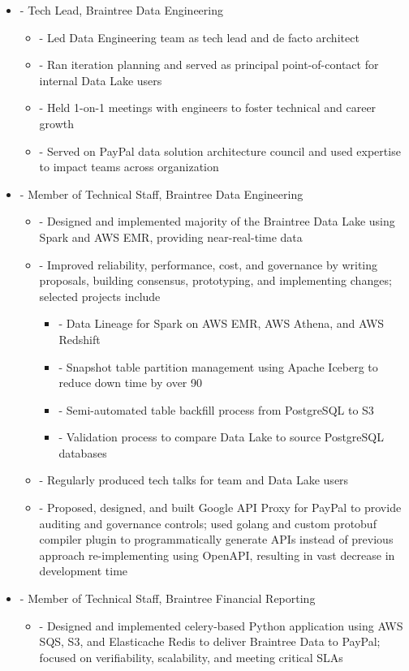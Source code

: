 \documentclass[a4paper,11pt]{article}
\newenvironment{pitemize}{
\begin{itemize}
\setlength{\itemsep}{.01in}
\setlength{\parskip}{.01in}
}
{\end{itemize}}
\begin{document}
\begin{pitemize}
    \item[-]Tech Lead, Braintree Data Engineering
    \begin{pitemize}
        \item[-]Led Data Engineering team as tech lead and de facto architect
        \item[-]Ran iteration planning and served as principal point-of-contact for internal Data Lake users
        \item[-]Held 1-on-1 meetings with engineers to foster technical and career growth
        \item[-]Served on PayPal data solution architecture council and used expertise to impact teams across organization
    \end{pitemize}
    \item[-]Member of Technical Staff, Braintree Data Engineering
    \begin{pitemize}
        \item[-]Designed and implemented majority of the Braintree Data Lake using Spark and AWS EMR, providing near-real-time data
        \item[-]Improved reliability, performance, cost, and governance by writing proposals, building consensus, prototyping, and implementing changes; selected projects include
        \begin{pitemize}
            \item[-]Data Lineage for Spark on AWS EMR, AWS Athena, and AWS Redshift
            \item[-]Snapshot table partition management using Apache Iceberg to reduce down time by over 90%
            \item[-]Semi-automated table backfill process from PostgreSQL to S3
            \item[-]Validation process to compare Data Lake to source PostgreSQL databases
        \end{pitemize}
    \item[-]Regularly produced tech talks for team and Data Lake users
    \item[-]Proposed, designed, and built Google API Proxy for PayPal to provide auditing and governance controls; used golang and custom protobuf compiler plugin to programmatically generate APIs instead of previous approach re-implementing using OpenAPI, resulting in vast decrease in development time
    \end{pitemize}
    \item[-]Member of Technical Staff, Braintree Financial Reporting
    \begin{pitemize}
        \item[-]Designed and implemented celery-based Python application using AWS SQS, S3, and Elasticache Redis to deliver Braintree Data to PayPal; focused on verifiability, scalability, and meeting critical SLAs
    \end{pitemize}
\end{pitemize}
\end{document}

